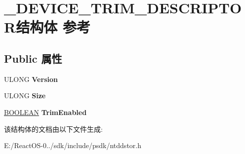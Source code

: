\hypertarget{struct___d_e_v_i_c_e___t_r_i_m___d_e_s_c_r_i_p_t_o_r}{}\section{\+\_\+\+D\+E\+V\+I\+C\+E\+\_\+\+T\+R\+I\+M\+\_\+\+D\+E\+S\+C\+R\+I\+P\+T\+O\+R结构体 参考}
\label{struct___d_e_v_i_c_e___t_r_i_m___d_e_s_c_r_i_p_t_o_r}
\subsection*{Public 属性}
\begin{DoxyCompactItemize}
\item 
\mbox{\label{struct___d_e_v_i_c_e___t_r_i_m___d_e_s_c_r_i_p_t_o_r_ac53744c9a5622a36b03fd529e7b029c6}} 
U\+L\+O\+NG {\bfseries Version}
\item 
\mbox{\label{struct___d_e_v_i_c_e___t_r_i_m___d_e_s_c_r_i_p_t_o_r_a68b47356590d0f428636c63930efe20f}} 
U\+L\+O\+NG {\bfseries Size}
\item 
\mbox{\label{struct___d_e_v_i_c_e___t_r_i_m___d_e_s_c_r_i_p_t_o_r_abcefb03543d495d00a80c8b95cfcff0c}} 
\hyperlink{_processor_bind_8h_a112e3146cb38b6ee95e64d85842e380a}{B\+O\+O\+L\+E\+AN} {\bfseries Trim\+Enabled}
\end{DoxyCompactItemize}


该结构体的文档由以下文件生成\+:\begin{DoxyCompactItemize}
\item 
E\+:/\+React\+O\+S-\/0../sdk/include/psdk/ntddstor.\+h\end{DoxyCompactItemize}

